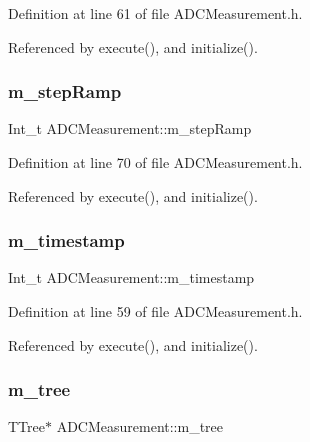 Definition at line 61 of file A\+D\+C\+Measurement.\+h.



Referenced by execute(), and initialize().

\mbox{\label{classADCMeasurement_aa73b7cbd45e13df16291ff740f6140fe}} 
\subsubsection{\texorpdfstring{m\+\_\+step\+Ramp}{m\_stepRamp}}
{\footnotesize\ttfamily Int\+\_\+t A\+D\+C\+Measurement\+::m\+\_\+step\+Ramp\hspace{0.3cm}{\ttfamily [private]}}



Definition at line 70 of file A\+D\+C\+Measurement.\+h.



Referenced by execute(), and initialize().

\mbox{\label{classADCMeasurement_a1fa77f5df72a81eab7e55e97d4bea27f}} 
\subsubsection{\texorpdfstring{m\+\_\+timestamp}{m\_timestamp}}
{\footnotesize\ttfamily Int\+\_\+t A\+D\+C\+Measurement\+::m\+\_\+timestamp\hspace{0.3cm}{\ttfamily [private]}}



Definition at line 59 of file A\+D\+C\+Measurement.\+h.



Referenced by execute(), and initialize().

\mbox{\label{classADCMeasurement_ac218556f79d8a0533b292e96347ccd29}} 
\subsubsection{\texorpdfstring{m\+\_\+tree}{m\_tree}}
{\footnotesize\ttfamily T\+Tree$\ast$ A\+D\+C\+Measurement\+::m\+\_\+tree\hspace{0.3cm}{\ttfamily [private]}}



